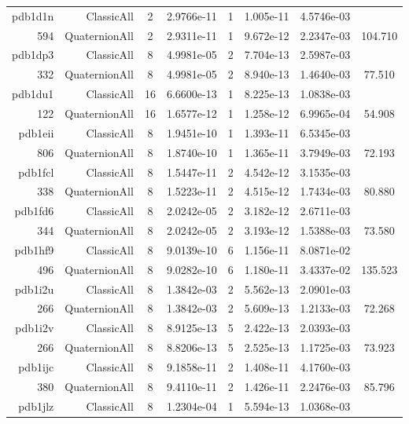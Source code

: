 \begin{xltabular}{\textwidth}{r|rcS[table-format=1.4e+2]cS[table-format=1.3e+2]S[table-format=1.4e+2]S[table-format=-1.3]}
pdb1d1n & ClassicAll & 2 & 2.9766e-11 & 1 & 1.005e-11 & 4.5746e-03 & \\
594 & QuaternionAll & 2 & 2.9311e-11 & 1 & 9.672e-12 & 2.2347e-03 & 104.710\\  \addlinespace
pdb1dp3 & ClassicAll & 8 & 4.9981e-05 & 2 & 7.704e-13 & 2.5987e-03 & \\
332 & QuaternionAll & 8 & 4.9981e-05 & 2 & 8.940e-13 & 1.4640e-03 & 77.510\\  \addlinespace
pdb1du1 & ClassicAll & 16 & 6.6600e-13 & 1 & 8.225e-13 & 1.0838e-03 & \\
122 & QuaternionAll & 16 & 1.6577e-12 & 1 & 1.258e-12 & 6.9965e-04 & 54.908\\  \addlinespace
pdb1eii & ClassicAll & 8 & 1.9451e-10 & 1 & 1.393e-11 & 6.5345e-03 & \\
806 & QuaternionAll & 8 & 1.8740e-10 & 1 & 1.365e-11 & 3.7949e-03 & 72.193\\  \addlinespace
pdb1fcl & ClassicAll & 8 & 1.5447e-11 & 2 & 4.542e-12 & 3.1535e-03 & \\
338 & QuaternionAll & 8 & 1.5223e-11 & 2 & 4.515e-12 & 1.7434e-03 & 80.880\\  \addlinespace
pdb1fd6 & ClassicAll & 8 & 2.0242e-05 & 2 & 3.182e-12 & 2.6711e-03 & \\
344 & QuaternionAll & 8 & 2.0242e-05 & 2 & 3.193e-12 & 1.5388e-03 & 73.580\\  \addlinespace
pdb1hf9 & ClassicAll & 8 & 9.0139e-10 & 6 & 1.156e-11 & 8.0871e-02 & \\
496 & QuaternionAll & 8 & 9.0282e-10 & 6 & 1.180e-11 & 3.4337e-02 & 135.523\\  \addlinespace
pdb1i2u & ClassicAll & 8 & 1.3842e-03 & 2 & 5.562e-13 & 2.0901e-03 & \\
266 & QuaternionAll & 8 & 1.3842e-03 & 2 & 5.609e-13 & 1.2133e-03 & 72.268\\  \addlinespace
pdb1i2v & ClassicAll & 8 & 8.9125e-13 & 5 & 2.422e-13 & 2.0393e-03 & \\
266 & QuaternionAll & 8 & 8.8206e-13 & 5 & 2.525e-13 & 1.1725e-03 & 73.923\\  \addlinespace
pdb1ijc & ClassicAll & 8 & 9.1858e-11 & 2 & 1.408e-11 & 4.1760e-03 & \\
380 & QuaternionAll & 8 & 9.4110e-11 & 2 & 1.426e-11 & 2.2476e-03 & 85.796\\  \addlinespace
pdb1jlz & ClassicAll & 8 & 1.2304e-04 & 1 & 5.594e-13 & 1.0368e-03 & \\

\end{xltabular}

